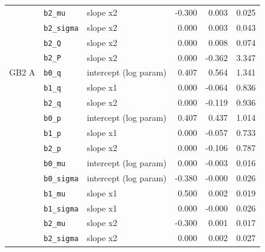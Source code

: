 {\begin{longtable}{lllrrr}
 & \texttt{b2\_mu} & slope x2 & -0.300 & 0.003 & 0.025 \\
 & \texttt{b2\_sigma} & slope x2 & 0.000 & 0.003 & 0.043 \\
 & \texttt{b2\_Q} & slope x2 & 0.000 & 0.008 & 0.074 \\
 & \texttt{b2\_P} & slope x2 & 0.000 & -0.362 & 3.347 \\
GB2 A & \texttt{b0\_q} & intercept (log param) & 0.407 & 0.564 & 1.341 \\
 & \texttt{b1\_q} & slope x1 & 0.000 & -0.064 & 0.836 \\
 & \texttt{b2\_q} & slope x2 & 0.000 & -0.119 & 0.936 \\
 & \texttt{b0\_p} & intercept (log param) & 0.407 & 0.437 & 1.014 \\
 & \texttt{b1\_p} & slope x1 & 0.000 & -0.057 & 0.733 \\
 & \texttt{b2\_p} & slope x2 & 0.000 & -0.106 & 0.787 \\
 & \texttt{b0\_mu} & intercept (log param) & 0.000 & -0.003 & 0.016 \\
 & \texttt{b0\_sigma} & intercept (log param) & -0.380 & -0.000 & 0.026 \\
 & \texttt{b1\_mu} & slope x1 & 0.500 & 0.002 & 0.019 \\
 & \texttt{b1\_sigma} & slope x1 & 0.000 & -0.000 & 0.026 \\
 & \texttt{b2\_mu} & slope x2 & -0.300 & 0.001 & 0.017 \\
 & \texttt{b2\_sigma} & slope x2 & 0.000 & 0.002 & 0.027 \\
\end{longtable}}
